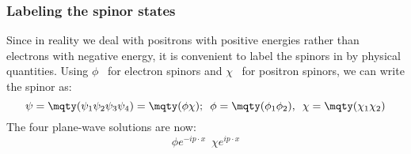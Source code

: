 \begin{frame}
\frametitle{Labeling the spinor states}
Since in reality we deal with positrons with positive energies rather than electrons with negative energy, it is convenient to label the spinors in by physical quantities. Using $\phi$~ for electron spinors and $\chi$~ for positron spinors, we can write the spinor as:
\[
\psi = \mqty(\psi_1 \\ \psi_2 \\ \psi_3 \\ \psi_4) =  \mqty(\phi \\ \chi); \,\,\,
\phi =  \mqty(\phi_1 \\ \phi_2), \,\,\, \chi =  \mqty(\chi_1 \\ \chi_2)
\]
The four plane-wave solutions are now:
\[
\phi e^{-i p\cdot x} \,\,\, \chi e^{i p\cdot x}
\]
\end{frame}
